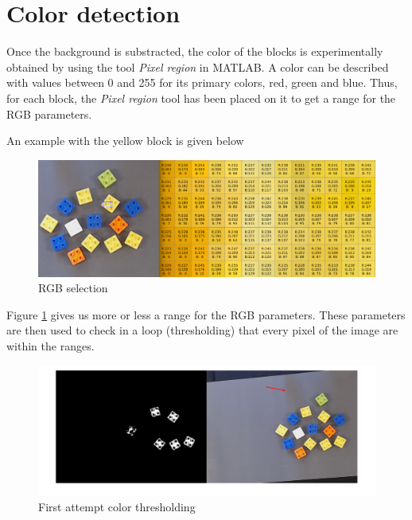 \section{Color detection}

 	Once the background is substracted, the color of the blocks is experimentally obtained by using the tool \textit{Pixel region} in MATLAB. A color can be described with values between 0 and 255 for its primary colors, red, green and blue. Thus, for each block, the \textit{Pixel region} tool has been placed on it to get a range for the RGB parameters.\par

An example with the yellow block is given below
\par

\begin{figure}[hb]
  \centering
  \includegraphics[scale=0.3]{figures/Thres_Y_manualy2.png}
  \caption[LABEL] {RGB selection}
  \label{fig:color1}
\end{figure}

Figure \ref{fig:color1} gives us more or less a range for the RGB parameters. These parameters are then used to check in a loop (thresholding) that every pixel of the image are within the ranges.\par

\begin{figure}[hb]
  \centering
  \includegraphics[scale=0.3]{figures/Thres_Y_bad2.png}
  \caption[LABEL] {First attempt color thresholding}
  \label{fig:color2}
\end{figure}
  

